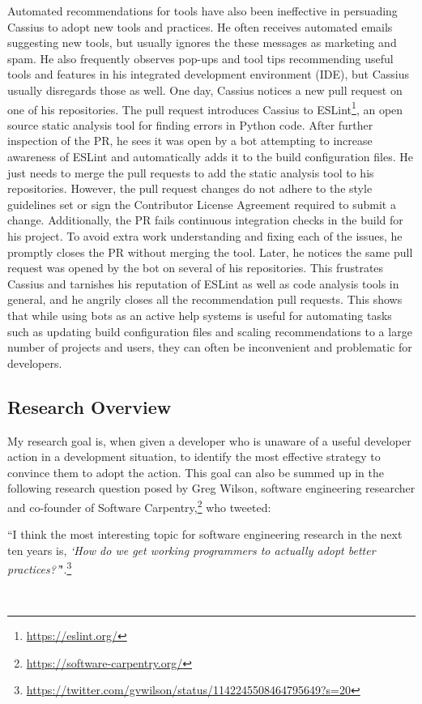 Automated recommendations for tools have also been ineffective in persuading Cassius to adopt new tools and practices. He often receives automated emails suggesting new tools, but usually ignores the these messages as marketing and spam. He also frequently observes pop-ups and tool tips recommending useful tools and features in his integrated development environment (IDE), but Cassius usually disregards those as well. One day, Cassius notices a new pull request on one of his repositories. The pull request introduces Cassius to ESLint\footnote{\url{https://eslint.org/}}, an open source static analysis tool for finding errors in Python code. After further inspection of the PR, he sees it was open by a bot attempting to increase awareness of ESLint and automatically adds it to the build configuration files. He just needs to merge the pull requests to add the static analysis tool to his repositories. However, the pull request changes do not adhere to the style guidelines set or sign the Contributor License Agreement required to submit a change. Additionally, the PR fails continuous integration checks in the build for his project. To avoid extra work understanding and fixing each of the issues, he promptly closes the PR without merging the tool. Later, he notices the same pull request was opened by the bot on several of his repositories. This frustrates Cassius and tarnishes his reputation of ESLint as well as code analysis tools in general, and he angrily closes all the recommendation pull requests. This shows that while using bots as an active help systems is useful for automating tasks such as updating build configuration files and scaling recommendations to a large number of projects and users, they can often be inconvenient and problematic for developers.

\subsection{Research Overview}

My research goal is, when given a developer who is unaware of a useful developer action in a development situation, to identify the most effective strategy to convince them to adopt the action. This goal can also be summed up in the following research question posed by Greg Wilson, software engineering researcher and co-founder of Software Carpentry,\footnote{\url{https://software-carpentry.org/}} who tweeted: \\

\begin{blockquote}
``I think the most interesting topic for software engineering research in the next ten years is, \textit{`How do we get working programmers to actually adopt better practices?'}".\footnote{\url{https://twitter.com/gvwilson/status/1142245508464795649?s=20}}
\end{blockquote} \\

